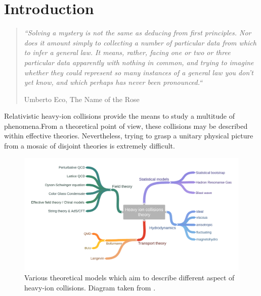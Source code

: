 \setchapterpreamble[u]{\margintoc}

\chapter{Introduction}

\begin{fullwidth}
\begin{quote}
  {\itshape ``Solving a mystery is not the same as deducing from first principles. Nor
does it amount simply to collecting a number of particular data from which to infer a general law. It
means, rather, facing one or two or three particular data apparently with nothing in common, and
trying to imagine whether they could represent so many instances of a general law you don’t yet
know, and which perhaps has never been pronounced.``}
  \begin{flushright}
    Umberto Eco, {\sffamily\color{ming} The Name of the Rose}
  \end{flushright}
\end{quote}
\end{fullwidth}

\vspace{1cm}

Relativistic heavy-ion collisions provide the means to study a multitude of phenomena.From a theoretical point of view, these collisions may be described within effective theories. Nevertheless, trying to grasp a unitary physical picture from a mosaic of disjoint theories is extremely difficult. 

\begin{figure}[!hbt]
	\includegraphics[width=1.5\textwidth]{images/Heavy_ion_collisionstheory.pdf}
	\caption{\normalsize Various theoretical models which aim to describe different aspect of heavy-ion collisions. Diagram taken from \cite{Oliinychenko:2017sfl}.} 
\end{figure}

